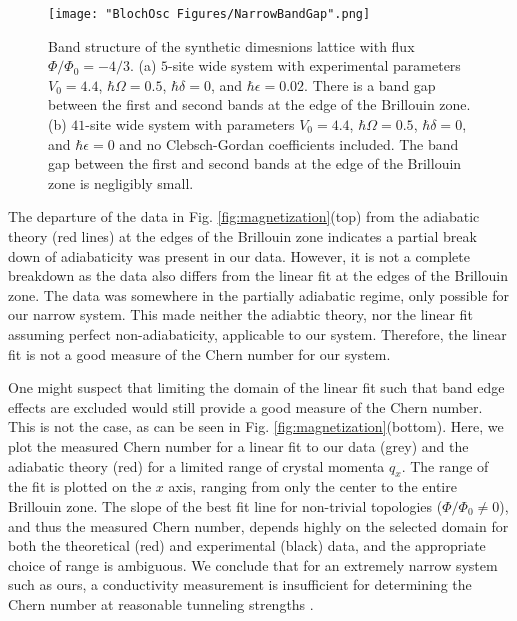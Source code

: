 \begin{figure}
\texttt{[image: "BlochOsc Figures/NarrowBandGap".png]}
\caption[Band structure of the synthetic dimesnions lattice with flux $\Phi/\Phi_0=-4/3$ ]{Band structure of the synthetic dimesnions lattice with flux $\Phi/\Phi_0=-4/3$. (a) $5$-site wide system with experimental parameters $V_0=4.4$, $\hbar\Omega = 0.5$, $\hbar\delta=0$, and $\hbar\epsilon = 0.02$. There is a band gap between the first and second bands at the edge of the Brillouin zone. (b) $41$-site wide system with parameters $V_0=4.4$, $\hbar\Omega = 0.5$, $\hbar\delta=0$, and $\hbar\epsilon = 0$ and no Clebsch-Gordan coefficients included. The band gap between the first and second bands at the edge of the Brillouin zone is negligibly small. }
\label{fig:narrowBandGap}
\end{figure}

The departure of the data in Fig. \ref{fig:magnetization}(top) from the adiabatic theory (red lines) at the edges of the Brillouin zone indicates a partial break down of adiabaticity was present in our data. However, it is not a complete breakdown as the data also differs from the linear fit at the edges of the Brillouin zone. The data was somewhere in the partially adiabatic regime, only possible for our narrow system. This made neither the adiabtic theory, nor the linear fit assuming perfect non-adiabaticity, applicable to our system. Therefore, the linear fit is not a good measure of the Chern number for our system.

One might suspect that limiting the domain of the linear fit such that band edge effects are excluded would still provide a good measure of the Chern number. This is not the case, as can be seen in Fig. \ref{fig:magnetization}(bottom). Here, we plot the measured Chern number for a linear fit to our data (grey) and the adiabatic theory (red) for a limited range of crystal momenta $q_x$. The range of the fit is plotted on the $x$ axis, ranging from only the center to the entire Brillouin zone.  The slope of the best fit line for non-trivial topologies ($\Phi/\Phi_0\neq0$), and thus the measured Chern number, depends highly on the selected domain for both the theoretical (red) and experimental (black) data, and the appropriate choice of range is ambiguous. We conclude that for an extremely narrow system such as ours, a conductivity measurement is insufficient for determining the Chern number at reasonable tunneling strengths \cite{Mugel2017}. 


